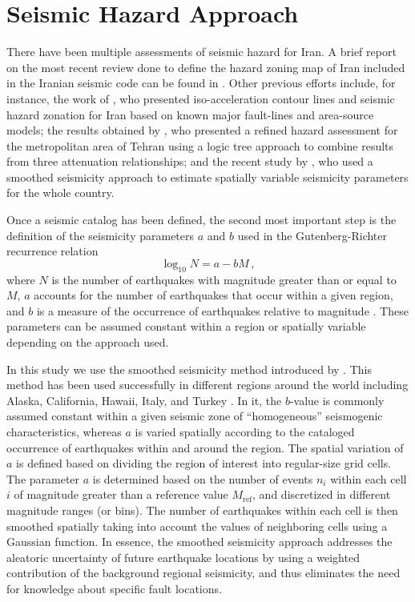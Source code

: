 
\section{Seismic Hazard Approach}

There have been multiple assessments of seismic hazard for Iran. A brief report on the most recent review done to define the hazard zoning map of Iran included in the Iranian seismic code \citep{BHRC2014} can be found in \citet{Moinfar_2012_WCEE}. Other previous efforts include, for instance, the work of \citet{Tavakoli1999}, who presented iso-acceleration contour lines and seismic hazard zonation for Iran based on known major fault-lines and area-source models; the results obtained by \citet{Ghodrati2003}, who presented a refined hazard assessment for the metropolitan area of Tehran using a logic tree approach to combine results from three attenuation relationships; and the recent study by \citet{Khodaverdian_2016_BSSA}, who used a smoothed seismicity approach to estimate spatially variable seismicity parameters for the whole country.

Once a seismic catalog has been defined, the second most important step is the definition of the seismicity parameters $a$ and $b$ used in the Gutenberg-Richter recurrence relation
%
\begin{equation}
	\log_{10} N = a - b M \, ,
\end{equation}
%
\noindent
where $N$ is the number of earthquakes with magnitude greater than or equal to $M$, $a$ accounts for the number of earthquakes that occur within a given region, and $b$ is a measure of the occurrence of earthquakes relative to magnitude \citep{Gutenberg1944}. These parameters can be assumed constant within a region or spatially variable depending on the approach used.

In this study we use the smoothed seismicity method introduced by \citet{Frankel1995}. This method has been used successfully in different regions around the world including Alaska, California, Hawaii, Italy, and Turkey \citep[e.g.,][]{Cao1996, Klein2001, Akinci2004, Kalkan2009, Moschetti2014, Kagan1994}. In it, the $b$-value is commonly assumed constant within a given seismic zone of ``homogeneous'' seismogenic characteristics, whereas $a$ is varied spatially according to the cataloged occurrence of earthquakes within and around the region. The spatial variation of $a$ is defined based on dividing the region of interest into regular-size grid cells. The parameter $a$ is determined based on the number of events $n_i$ within each cell $i$ of magnitude greater than a reference value $M_{\mathrm{ref}}$, and discretized in different magnitude ranges (or bins). The number of earthquakes within each cell is then smoothed spatially taking into account the values of neighboring cells using a Gaussian function. In essence, the smoothed seismicity approach addresses the aleatoric uncertainty of future earthquake locations by using a weighted contribution of the background regional seismicity, and thus eliminates the need for knowledge about specific fault locations.

